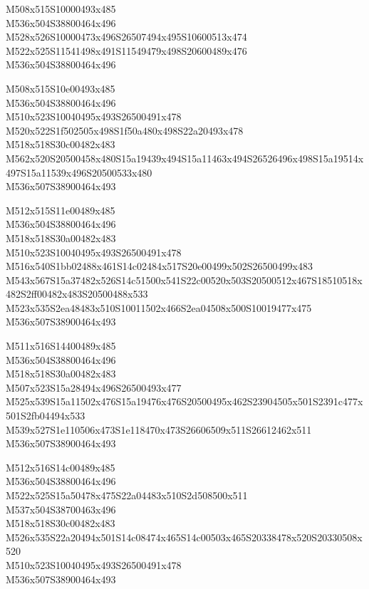\documentclass{article}
\begin{document}
\begin{multicols}{5}
\begin{center}

M508x515S10000493x485 %
\\M536x504S38800464x496 %
\\M528x526S10000473x496S26507494x495S10600513x474 %
\\M522x525S11541498x491S11549479x498S20600489x476 %
\\M536x504S38800464x496 %
\vfil
\columnbreak

M508x515S10e00493x485 %
\\M536x504S38800464x496 %
\\M510x523S10040495x493S26500491x478 %
\\M520x522S1f502505x498S1f50a480x498S22a20493x478 %
\\M518x518S30c00482x483 %
\\M562x520S20500458x480S15a19439x494S15a11463x494S26526496x498S15a19514x497S15a11539x496S20500533x480 %
\\M536x507S38900464x493 %
\vfil
\columnbreak

M512x515S11e00489x485 %
\\M536x504S38800464x496 %
\\M518x518S30a00482x483 %
\\M510x523S10040495x493S26500491x478 %
\\M516x540S1bb02488x461S14c02484x517S20e00499x502S26500499x483 %
\\M543x567S15a37482x526S14c51500x541S22c00520x503S20500512x467S18510518x482S2ff00482x483S20500488x533 %
\\M523x535S2ea48483x510S10011502x466S2ea04508x500S10019477x475 %
\\M536x507S38900464x493 %
\vfil
\columnbreak

M511x516S14400489x485 %
\\M536x504S38800464x496 %
\\M518x518S30a00482x483 %
\\M507x523S15a28494x496S26500493x477 %
\\M525x539S15a11502x476S15a19476x476S20500495x462S23904505x501S2391c477x501S2fb04494x533 %
\\M539x527S1e110506x473S1e118470x473S26606509x511S26612462x511 %
\\M536x507S38900464x493 %
\vfil
\columnbreak

M512x516S14c00489x485 %
\\M536x504S38800464x496 %
\\M522x525S15a50478x475S22a04483x510S2d508500x511 %
\\M537x504S38700463x496 %
\\M518x518S30c00482x483 %
\\M526x535S22a20494x501S14c08474x465S14c00503x465S20338478x520S20330508x520 %
\\M510x523S10040495x493S26500491x478 %
\\M536x507S38900464x493 %
\vfil

\end{center}
\end{multicols}
\end{document}
